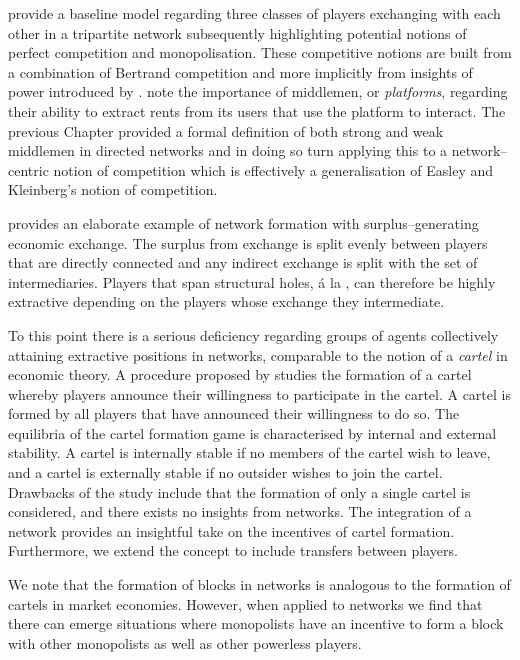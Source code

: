 \citet{EasleyKleinberg2010} provide a baseline model regarding three classes of players exchanging with each other in a tripartite network subsequently highlighting potential notions of perfect competition and monopolisation. These competitive notions are built from a combination of Bertrand competition and more implicitly from insights of power introduced by \citet{Emerson1962}. \citet{GillesDiamantaris2013} note the importance of middlemen, or \emph{platforms}, regarding their ability to extract rents from its users that use the platform to interact. The previous Chapter provided a formal definition of both strong and weak middlemen in directed networks and in doing so turn applying this to a network--centric notion of competition which is effectively a generalisation of Easley and Kleinberg's notion of competition.

\citet{GoyalVega-holes} provides an elaborate example of network formation with surplus--generating economic exchange. The surplus from exchange is split evenly between players that are directly connected and any indirect exchange is split with the set of intermediaries. Players that span structural holes, \'{a} la \citet{Burt1992}, can therefore be highly extractive depending on the players whose exchange they intermediate.

To this point there is a serious deficiency regarding groups of agents collectively attaining extractive positions in networks, comparable to the notion of a \emph{cartel} in economic theory. A procedure proposed by \citet{Aspremont1983} studies the formation of a cartel whereby players announce their willingness to participate in the cartel. A cartel is formed by all players that have announced their willingness to do so. The equilibria of the cartel formation game is characterised by internal and external stability. A cartel is internally stable if no members of the cartel wish to leave, and a cartel is externally stable if no outsider wishes to join the cartel. Drawbacks of the study include that the formation of only a single cartel is considered, and there exists no insights from networks. The integration of a network provides an insightful take on the incentives of cartel formation. Furthermore, we extend the concept to include transfers between players.

We note that the formation of blocks in networks is analogous to the formation of cartels in market economies. However, when applied to networks we find that there can emerge situations where monopolists have an incentive to form a block with other monopolists as well as other powerless players.


